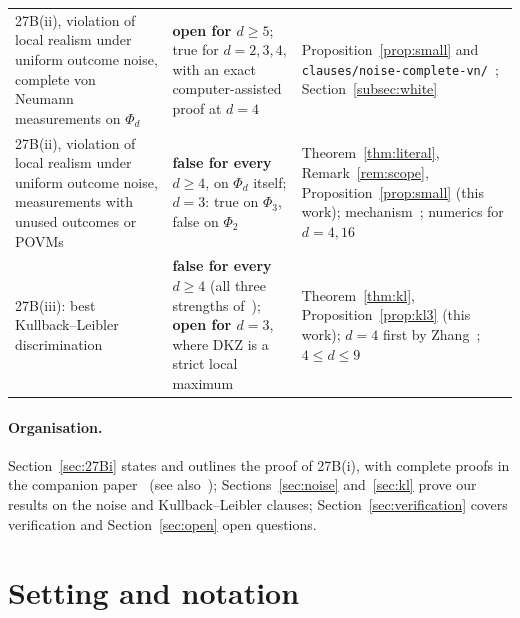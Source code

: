 \documentclass[11pt]{article}
\theoremstyle{remark}
\numberwithin{equation}{section}
\begin{document}
\begin{table}[t]
\begin{tabular}{@{}>{\raggedright\arraybackslash}p{}>{\raggedright\arraybackslash}p{}>{\raggedright\arraybackslash}p{}@{}}
27B(ii), violation of local realism under uniform outcome noise, complete von Neumann measurements on $\Phi_d$ &
\textbf{open for $d\ge5$}; true for $d=2,3,4$, with an exact computer-assisted proof at $d=4$ & Proposition~\ref{prop:small} and \texttt{clauses/noise-complete-vn/}~\cite{repo}; Section~\ref{subsec:white}\\
27B(ii), violation of local realism under uniform outcome noise, measurements with unused outcomes or POVMs &
\textbf{false for every $d\ge4$}, on $\Phi_d$ itself; $d=3$: true on $\Phi_3$, false on $\Phi_2$ &
Theorem~\ref{thm:literal}, Remark~\ref{rem:scope}, Proposition~\ref{prop:small} (this work);
mechanism~\cite[eq.~(14)]{ADGL}; numerics for $d=4,16$~\cite{BRL}\\
27B(iii): best Kullback--Leibler discrimination & \textbf{false for every $d\ge4$} (all three strengths
of~\cite{vDGG}); \textbf{open for $d=3$}, where DKZ is a strict local maximum & Theorem~\ref{thm:kl},
Proposition~\ref{prop:kl3} (this work); $d=4$ first by Zhang~\cite{Zhang}; $4\le d\le9$~\cite{repoCGLMP}\\
\bottomrule
\end{tabular}
\end{table}

\paragraph{Organisation.}
Section~\ref{sec:27Bi} states and outlines the proof of 27B(i), with complete proofs in the companion
paper~\cite{MSmath} (see also~\cite{MSoverview}); Sections~\ref{sec:noise} and~\ref{sec:kl} prove our results on the
noise and Kullback--Leibler clauses; Section~\ref{sec:verification} covers verification and Section~\ref{sec:open} open
questions.

\section{Setting and notation}\label{sec:setting}
\end{document}
